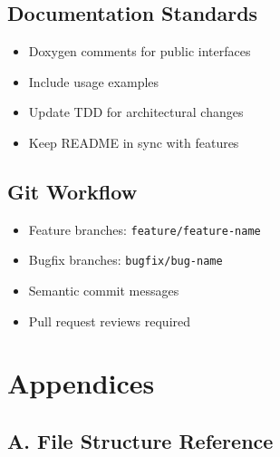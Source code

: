 \documentclass[12pt,a4paper,oneside,openany]{report}
\begin{document}
\section{Documentation Standards}

\begin{itemize}
	\item Doxygen comments for public interfaces
	\item Include usage examples
	\item Update TDD for architectural changes
	\item Keep README in sync with features
\end{itemize}

\section{Git Workflow}

\begin{itemize}
	\item Feature branches: \texttt{feature/feature-name}
	\item Bugfix branches: \texttt{bugfix/bug-name}
	\item Semantic commit messages
	\item Pull request reviews required
\end{itemize}

\chapter*{Appendices}

\section*{A. File Structure Reference}
\end{document}
